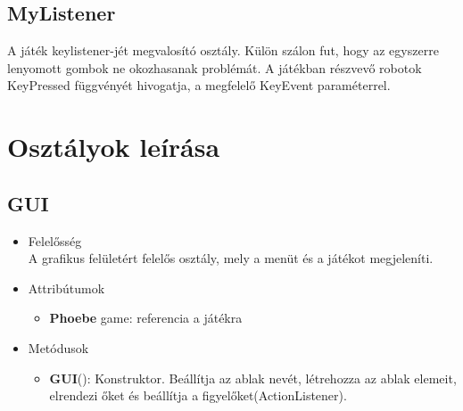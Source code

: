 \subsection{MyListener}
A játék keylistener-jét megvalosító osztály. Külön szálon fut, hogy az egyszerre lenyomott gombok ne okozhasanak problémát. A játékban részvevő robotok KeyPressed függvényét hivogatja, a megfelelő KeyEvent paraméterrel.
\section{Osztályok leírása}


\subsection{GUI}
\begin{itemize}
\item Felelősség\\
A grafikus felületért felelős osztály, mely a menüt és a játékot megjeleníti.
\item Attribútumok
	\begin{itemize}
		\item \textbf{Phoebe} game: referencia a játékra
	\end{itemize}
\item Metódusok
	\begin{itemize}
		\item\textbf{GUI}(): Konstruktor. Beállítja az ablak nevét, létrehozza az ablak elemeit, elrendezi őket és beállítja a figyelőket(ActionListener).
	\end{itemize}
\end{itemize}

